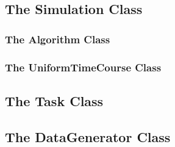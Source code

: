 
 \subsection[Simulation]{The Simulation Class}
 

 \subsubsection[Algorithm]{The Algorithm Class}
 

 \subsubsection[UniformTimeCourse]{The UniformTimeCourse Class}
 


%

%


 \subsection[Task]{The Task Class}
 


 \subsection[DataGenerator]{The DataGenerator Class}
 


